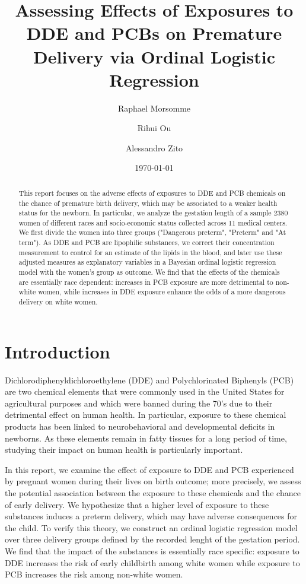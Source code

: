 \documentclass[10pt]{jmlr}%
\title[DDE and PCB effect on Premature delivery]{Assessing Effects of Exposures to DDE and PCBs on Premature Delivery via Ordinal Logistic Regression}	%
\author[Morsomme, Ou, Zito]{Raphael Morsomme \and Rihui Ou \and Alessandro Zito}
\date{\today} %
\begin{document}
\maketitle

\begin{abstract}
This report focuses on the adverse effects of exposures to DDE and PCB chemicals on the chance of premature birth delivery, which may be associated to a weaker health status for the newborn. In particular, we analyze the gestation length of a sample 2380 women of different races and socio-economic status collected across 11 medical centers. We first divide the women into three groups ("Dangerous preterm", "Preterm" and "At term"). As DDE and PCB are lipophilic substances, we correct their concentration measurement to control for an estimate of the lipids in the blood, and later use these adjusted measures as explanatory variables in a Bayesian ordinal logistic regression model with the women's group as outcome. We find that the effects of the chemicals are essentially race dependent: increases in PCB exposure are more detrimental to non-white women, while increases in DDE exposure enhance the odds of a more dangerous delivery on white women. 
\end{abstract}
\newpage
\section{Introduction}
\label{sec:intro}

Dichlorodiphenyldichloroethylene (DDE) and Polychlorinated Biphenyls (PCB) are two chemical elements that were commonly used in the United States for agricultural purposes and which were banned during the 70's due to their detrimental effect on human health. In particular, exposure to these chemical products has been linked to neurobehavioral and developmental deficits in newborns. As these elements remain in fatty tissues for a long period of time, studying their impact on human health is particularly important.

In this report, we examine the effect of exposure to DDE and PCB experienced by pregnant women during their lives on birth outcome; more precisely, we assess the potential association between the exposure to these chemicals and the chance of early delivery. We hypothesize that a higher level of exposure to these substances induces a preterm delivery, which may have adverse consequences for the child. To verify this theory, we construct an ordinal logistic regression model over three delivery groups defined by the recorded lenght of the gestation period.  We find that the impact of the substances is essentially race specific: exposure to DDE increases the risk of early childbirth among white women while exposure to PCB increases the risk among non-white women. 
\end{document}
